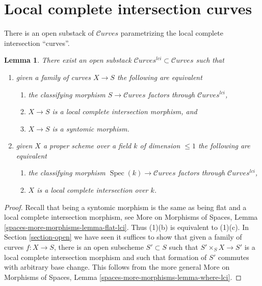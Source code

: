 \documentclass{stacks-project}
\theoremstyle{plain}
\newtheorem{lemma}[subsection]{Lemma}
\theoremstyle{definition}
\theoremstyle{remark}
\numberwithin{equation}{subsection}
\def\Spec{\mathop{\mathrm{Spec}}}
\def\Curvesstack{\mathcal{C}\!\mathit{urves}}
\begin{document}
\section{Local complete intersection curves}
\label{section-lci}

\noindent
There is an open substack of $\Curvesstack$ parametrizing
the local complete intersection ``curves''.

\begin{lemma}
\label{lemma-lci-curves}
There exist an open substack $\Curvesstack^{lci} \subset \Curvesstack$
such that
\begin{enumerate}
\item given a family of curves $X \to S$ the following are equivalent
\begin{enumerate}
\item the classifying morphism $S \to \Curvesstack$ factors through
$\Curvesstack^{lci}$,
\item $X \to S$ is a local complete intersection morphism, and
\item $X \to S$ is a syntomic morphism.
\end{enumerate}
\item given $X$ a proper scheme over a field $k$ of dimension $\leq 1$
the following are equivalent
\begin{enumerate}
\item the classifying morphism $\Spec(k) \to \Curvesstack$ factors
through $\Curvesstack^{lci}$,
\item $X$ is a local complete intersection over $k$.
\end{enumerate}
\end{enumerate}
\end{lemma}

\begin{proof}
Recall that being a syntomic morphism is the same as being flat and
a local complete intersection morphism, see
More on Morphisms of Spaces, Lemma \ref{spaces-more-morphisms-lemma-flat-lci}.
Thus (1)(b) is equivalent to (1)(c).
In Section \ref{section-open} we have seen
it suffices to show that given a family of curves
$f : X \to S$, there is an open subscheme $S' \subset S$
such that $S' \times_S X \to S'$ is a local complete intersection
morphism and such that formation of $S'$ commutes with arbitrary base change.
This follows from the more general
More on Morphisms of Spaces, Lemma \ref{spaces-more-morphisms-lemma-where-lci}.
\end{proof}
\end{document}
